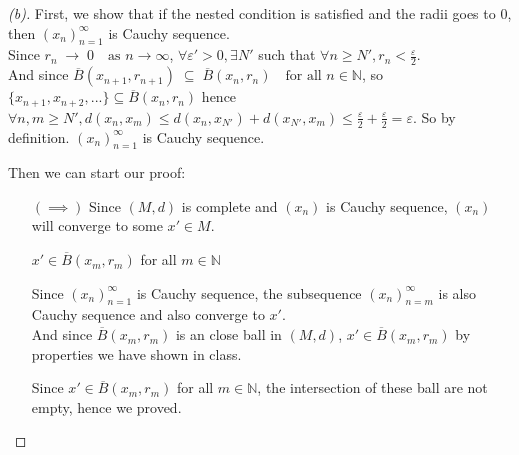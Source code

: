\begin{proof}[(b)]
    First, we show that if the nested condition is satisfied and the radii goes to \(0\), then $(x_n)_{n=1}^\infty$ is Cauchy sequence. \\
    Since $r_n \;\to\; 0 \quad\text{as } n\to\infty$, $\forall \varepsilon' > 0, \exists N'$ such that $\forall n \geq N', r_n < \frac{\varepsilon}{2}$. \\
    And since $\overline{B}(x_{n+1},r_{n+1}) \;\subseteq\; \overline{B}(x_n,r_n) \quad\text{for all } n\in\mathbb{N}$, so $\{x_{n+1},x_{n+2}, ...\} \subseteq \overline{B}(x_n,r_n)$ hence $\forall n, m \geq N', d(x_n, x_m) \leq d(x_n, x_{N'}) + d(x_{N'}, x_m) \leq \frac{\varepsilon}{2} + \frac{\varepsilon}{2} = \varepsilon$.
    So by definition. $(x_n)_{n=1}^\infty$ is Cauchy sequence.

    Then we can start our proof:
    \begin{itemize}
        \item [\((\implies )\)] Since $(M,d)$ is complete and $(x_n)$ is Cauchy sequence, $(x_n)$ will converge to some $x' \in M$. \\
        \begin{claim}
            $x' \in \overline{B}(x_m,r_m)$ for all $m \in \mathbb{N}$
        \end{claim}
        \begin{explanation}
            Since $(x_n)_{n=1}^\infty$ is Cauchy sequence, the subsequence $(x_n)_{n=m}^\infty$ is also Cauchy sequence and also converge to $x'$. \\
            And since $\overline{B}(x_m,r_m)$ is an close ball in $(M, d)$, $x' \in \overline{B}(x_m,r_m)$ by properties we have shown in class.
        \end{explanation}
        Since $x' \in \overline{B}(x_m,r_m)$ for all $m \in \mathbb{N}$, the intersection of these ball are not empty, hence we proved.


\end{itemize}
\end{proof}
